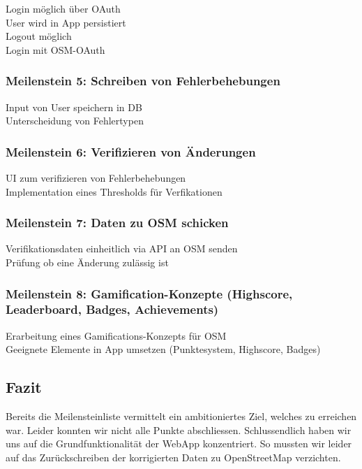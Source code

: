 \tick Login möglich über OAuth \\
\tick User wird in App persistiert \\
\tick Logout möglich \\
\tick Login mit OSM-OAuth

\subsubsection{Meilenstein 5: Schreiben von Fehlerbehebungen}

\tick Input von User speichern in DB \\
\tick Unterscheidung von Fehlertypen

\subsubsection{Meilenstein 6: Verifizieren von Änderungen}

\tick UI zum verifizieren von Fehlerbehebungen \\
\tick Implementation eines Thresholds für Verfikationen

\subsubsection{Meilenstein 7: Daten zu OSM schicken}

\cross Verifikationsdaten einheitlich via API an OSM senden \\
\cross Prüfung ob eine Änderung zulässig ist

\subsubsection{Meilenstein 8: Gamification-Konzepte (Highscore, Leaderboard, Badges, Achievements)}

\tick Erarbeitung eines Gamifications-Konzepts für OSM \\
\tick Geeignete Elemente in App umsetzen (Punktesystem, Highscore, Badges)

\subsection{Fazit}
Bereits die Meilensteinliste vermittelt ein ambitioniertes Ziel, welches zu erreichen war.
Leider konnten wir nicht alle Punkte abschliessen.
Schlussendlich haben wir uns auf die Grundfunktionalität der \gls{WebApp} konzentriert.
So mussten wir leider auf das Zurückschreiben der korrigierten Daten zu \gls{OpenStreetMap} verzichten.